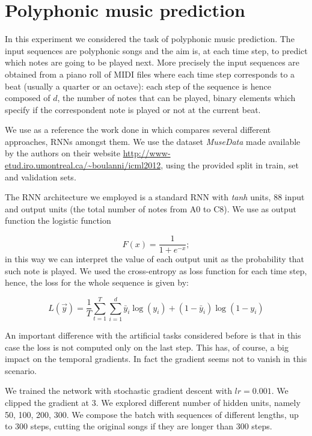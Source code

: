  
\section{Polyphonic music prediction}

In this experiment we considered the task of polyphonic music prediction. The input sequences are polyphonic songs and the aim is, at each time step, to predict which notes are going to be played next. More precisely the input sequences are obtained from a piano roll of MIDI files where each time step corresponds to a beat (usually a quarter or an octave): each step of the sequence is hence composed of $d$, the number of notes that can be played,  binary elements which specify if the correspondent note is played or not at the current beat.

We use as a reference the work done in \cite{BoulangerMuse} which compares several different approaches, RNNs amongst them. We use the dataset \textsl{MuseData} made available by the authors on their website
\url{http://www-etud.iro.umontreal.ca/~boulanni/icml2012}, using the provided split in train, set and validation sets.

The RNN architecture we employed is a standard RNN with \textit{tanh} units, 88 input and output units (the total number of notes from A0 to C8). We use as output function the logistic function

\begin{equation}
	F(x)=\frac{1}{1+e^{-x}};
\end{equation}
in this way we can interpret the value of each output unit as the probability that such note is played. We used the cross-entropy as loss function for each time step, hence, the loss for the whole sequence is given by:

\begin{equation}
	L(\vec{y}) = \frac{1}{T}\sum_{t=1}^{T}\sum_{i=1}^{d} \bar{y}_i \log(y_i) + (1-\bar{y}_i)\log(1-y_i)
\end{equation}

An important difference with the artificial tasks considered before is that in this case the loss is not computed only on the last step. This has, of course, a big impact on the temporal gradients. In fact the gradient seems not to vanish in this scenario. 

We trained the network with stochastic gradient descent with $lr=0.001$. We clipped the gradient at $3$. We explored different number of hidden units, namely 50, 100, 200, 300. We compose the batch with sequences of different lengths, up to 300 steps, cutting the original songs if they are longer than 300 steps.

